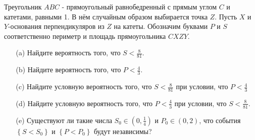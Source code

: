     \begin{prob}
        Треугольник $A B C$ - прямоугольный равнобедренный с прямым углом $C$ и катетами, равными 1. В нём случайным образом выбирается точка $Z$. Пусть $X$ и $Y$-основания перпендикуляров из $Z$ на катеты. Обозначим буквами $P$ и $S$ соответственно периметр и площадь прямоугольника $C X Z Y$.
        \begin{itemize}
            \item[(a)] Найдите вероятность того, что $S < \frac{8}{81}$.
            \item[(b)] Найдите вероятность того, что $P < \frac{4}{3}$.
            \item[(c)] Найдите условную вероятность того, что $S < \frac{8}{81}$ при условии, что $P < \frac{4}{3}$
            \item[(d)] Найдите условную вероятность того, что $P < \frac{4}{3}$ при условии, что $S < \frac{8}{81}$.
            \item[(e)] Существуют ли такие числа $S_{0} \in (0, \frac{1}{4})$ и $P_{0} \in (0, 2)$, что события $\left\{ S < S_{0} \right\}$ и $\left\{ P < P_{0} \right\}$ будут независимы?
        \end{itemize}
    \end{prob}
